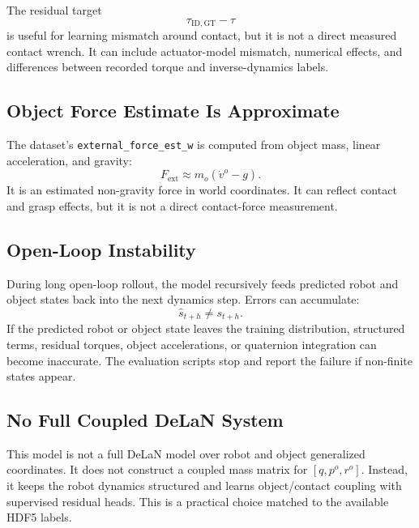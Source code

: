 \documentclass[11pt]{article}
\begin{document}
The residual target
\begin{equation}
  \tau_{\mathrm{ID,GT}} - \tau
\end{equation}
is useful for learning mismatch around contact, but it is not a direct measured
contact wrench. It can include actuator-model mismatch, numerical effects, and
differences between recorded torque and inverse-dynamics labels.

\subsection{Object Force Estimate Is Approximate}

The dataset's \texttt{external\_force\_est\_w} is computed from object mass,
linear acceleration, and gravity:
\begin{equation}
  F_{\mathrm{ext}} \approx m_o(\dot{v}^o - g).
\end{equation}
It is an estimated non-gravity force in world coordinates. It can reflect
contact and grasp effects, but it is not a direct contact-force measurement.

\subsection{Open-Loop Instability}

During long open-loop rollout, the model recursively feeds predicted robot and
object states back into the next dynamics step. Errors can accumulate:
\begin{equation}
  \hat{s}_{t+h}
  \neq
  s_{t+h}.
\end{equation}
If the predicted robot or object state leaves the training distribution,
structured terms, residual torques, object accelerations, or quaternion
integration can become inaccurate. The evaluation scripts stop and report the
failure if non-finite states appear.

\subsection{No Full Coupled DeLaN System}

This model is not a full DeLaN model over robot and object generalized
coordinates. It does not construct a coupled mass matrix for
\([q, p^o, r^o]\). Instead, it keeps the robot dynamics structured and learns
object/contact coupling with supervised residual heads. This is a practical
choice matched to the available HDF5 labels.
\end{document}
